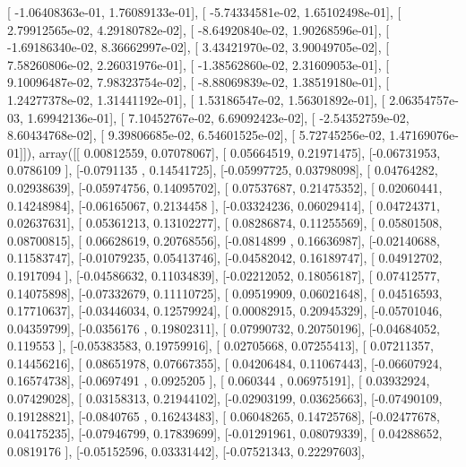 \documentclass{article}
\begin{document}
       [ -1.06408363e-01,   1.76089133e-01],
       [ -5.74334581e-02,   1.65102498e-01],
       [  2.79912565e-02,   4.29180782e-02],
       [ -8.64920840e-02,   1.90268596e-01],
       [ -1.69186340e-02,   8.36662997e-02],
       [  3.43421970e-02,   3.90049705e-02],
       [  7.58260806e-02,   2.26031976e-01],
       [ -1.38562860e-02,   2.31609053e-01],
       [  9.10096487e-02,   7.98323754e-02],
       [ -8.88069839e-02,   1.38519180e-01],
       [  1.24277378e-02,   1.31441192e-01],
       [  1.53186547e-02,   1.56301892e-01],
       [  2.06354757e-03,   1.69942136e-01],
       [  7.10452767e-02,   6.69092423e-02],
       [ -2.54352759e-02,   8.60434768e-02],
       [  9.39806685e-02,   6.54601525e-02],
       [  5.72745256e-02,   1.47169076e-01]]), array([[ 0.00812559,  0.07078067],
       [ 0.05664519,  0.21971475],
       [-0.06731953,  0.0786109 ],
       [-0.0791135 ,  0.14541725],
       [-0.05997725,  0.03798098],
       [ 0.04764282,  0.02938639],
       [-0.05974756,  0.14095702],
       [ 0.07537687,  0.21475352],
       [ 0.02060441,  0.14248984],
       [-0.06165067,  0.2134458 ],
       [-0.03324236,  0.06029414],
       [ 0.04724371,  0.02637631],
       [ 0.05361213,  0.13102277],
       [ 0.08286874,  0.11255569],
       [ 0.05801508,  0.08700815],
       [ 0.06628619,  0.20768556],
       [-0.0814899 ,  0.16636987],
       [-0.02140688,  0.11583747],
       [-0.01079235,  0.05413746],
       [-0.04582042,  0.16189747],
       [ 0.04912702,  0.1917094 ],
       [-0.04586632,  0.11034839],
       [-0.02212052,  0.18056187],
       [ 0.07412577,  0.14075898],
       [-0.07332679,  0.11110725],
       [ 0.09519909,  0.06021648],
       [ 0.04516593,  0.17710637],
       [-0.03446034,  0.12579924],
       [ 0.00082915,  0.20945329],
       [-0.05701046,  0.04359799],
       [-0.0356176 ,  0.19802311],
       [ 0.07990732,  0.20750196],
       [-0.04684052,  0.119553  ],
       [-0.05383583,  0.19759916],
       [ 0.02705668,  0.07255413],
       [ 0.07211357,  0.14456216],
       [ 0.08651978,  0.07667355],
       [ 0.04206484,  0.11067443],
       [-0.06607924,  0.16574738],
       [-0.0697491 ,  0.0925205 ],
       [ 0.060344  ,  0.06975191],
       [ 0.03932924,  0.07429028],
       [ 0.03158313,  0.21944102],
       [-0.02903199,  0.03625663],
       [-0.07490109,  0.19128821],
       [-0.0840765 ,  0.16243483],
       [ 0.06048265,  0.14725768],
       [-0.02477678,  0.04175235],
       [-0.07946799,  0.17839699],
       [-0.01291961,  0.08079339],
       [ 0.04288652,  0.0819176 ],
       [-0.05152596,  0.03331442],
       [-0.07521343,  0.22297603],
\end{document}
